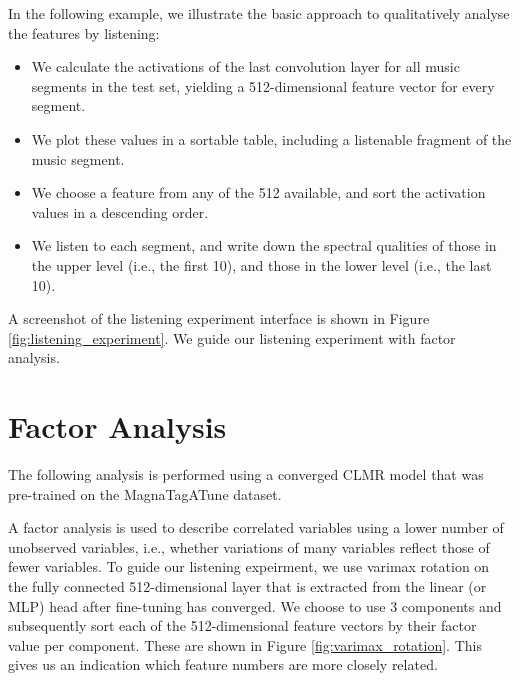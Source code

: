 In the following example, we illustrate the basic approach to qualitatively analyse the features by listening:
\begin{itemize}
    \item We calculate the activations of the last convolution layer for all music segments in the test set, yielding a 512-dimensional feature vector for every segment.
    \item We plot these values in a sortable table, including a listenable fragment of the music segment.
    \item We choose a feature from any of the 512 available, and sort the activation values in a descending order.
    \item We listen to each segment, and write down the spectral qualities of those in the upper level (i.e., the first 10), and those in the lower level (i.e., the last 10).
\end{itemize}

A screenshot of the listening experiment interface is shown in Figure \ref{fig:listening_experiment}.
We guide our listening experiment with factor analysis.

\section{Factor Analysis}
The following analysis is performed using a converged CLMR model that was pre-trained on the MagnaTagATune dataset.

A factor analysis is used to describe correlated variables using a lower number of unobserved variables, i.e., whether variations of many variables reflect those of fewer variables. To guide our listening expeirment, we use varimax rotation on the fully connected 512-dimensional layer that is extracted from the linear (or MLP) head after fine-tuning has converged. We choose to use 3 components and subsequently sort each of the 512-dimensional feature vectors by their factor value per component. These are shown in Figure \ref{fig:varimax_rotation}. This gives us an indication which feature numbers are more closely related.

